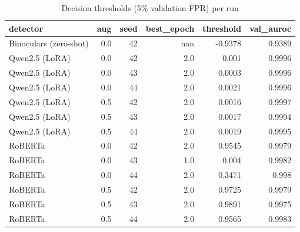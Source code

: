\begin{table}[!t]
\centering
\caption{Decision thresholds (5\% validation FPR) per run}
\label{tab:thresholds}
\footnotesize
\begin{tabular}{lrrrrr}
\toprule
\textbf{detector} & \textbf{aug} & \textbf{seed} & \textbf{best\_epoch} & \textbf{threshold} & \textbf{val\_auroc} \\
\midrule
Binoculars (zero-shot) & 0.0 & 42 & nan & -0.9378 & 0.9389 \\
Qwen2.5 (LoRA) & 0.0 & 42 & 2.0 & 0.001 & 0.9996 \\
Qwen2.5 (LoRA) & 0.0 & 43 & 2.0 & 0.0003 & 0.9996 \\
Qwen2.5 (LoRA) & 0.0 & 44 & 2.0 & 0.0021 & 0.9996 \\
Qwen2.5 (LoRA) & 0.5 & 42 & 2.0 & 0.0016 & 0.9997 \\
Qwen2.5 (LoRA) & 0.5 & 43 & 2.0 & 0.0017 & 0.9994 \\
Qwen2.5 (LoRA) & 0.5 & 44 & 2.0 & 0.0019 & 0.9995 \\
RoBERTa & 0.0 & 42 & 2.0 & 0.9545 & 0.9979 \\
RoBERTa & 0.0 & 43 & 1.0 & 0.004 & 0.9982 \\
RoBERTa & 0.0 & 44 & 2.0 & 0.3471 & 0.998 \\
RoBERTa & 0.5 & 42 & 2.0 & 0.9725 & 0.9979 \\
RoBERTa & 0.5 & 43 & 2.0 & 0.9891 & 0.9975 \\
RoBERTa & 0.5 & 44 & 2.0 & 0.9565 & 0.9983 \\
\bottomrule
\end{tabular}
\end{table}

